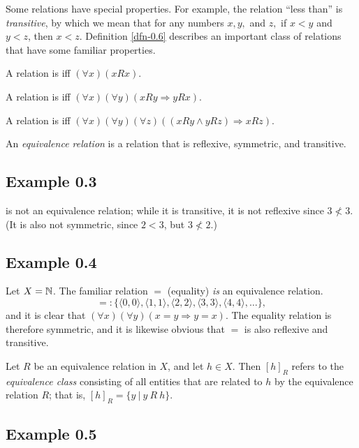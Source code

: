 Some relations have special properties. For example, the relation ``less than''
is \emph{transitive}, by which we mean that for any numbers $x, y,$ and $z,$
if $x < y$ and $y < z$, then $x < z$. Definition \ref{dfn-0.6} describes an important
class of relations that have some familiar properties.

\begin{dfn}\label{dfn-0.6}
A relation is \emph{} iff $(\forall x)(xRx)$.

A relation is \emph{} iff $(\forall x)(\forall y)(xRy
	\Rightarrow yRx)$.

A relation is \emph{} iff $(\forall x)(\forall y)(\forall z)
	((xRy \wedge yRz) \Rightarrow x Rz).$
    
An \emph{equivalence relation} is a relation that is reflexive, symmetric, and
transitive.
\end{dfn}

\subsection*{Example 0.3}

\< is not an equivalence relation; while it is transitive, it is not reflexive
since $3 \not< 3$. (It is also not symmetric, since $2 < 3$, but $3 \not< 2$.)

\subsection*{Example 0.4}

Let $X = \mathbb{N}$. The familiar relation $=$ (equality) \emph{is} an equivalence
relation.
\[= :\{\langle 0, 0\rangle , \langle 1,1\rangle , \langle 2,2\rangle ,
	\langle 3,3\rangle , \langle 4,4\rangle , \ldots \},\]
and it is clear that $(\forall x)(\forall y)(x = y \Rightarrow y = x)$.
The equality relation is therefore symmetric, and it is likewise obvious that
$=$ is also reflexive and transitive.

\begin{dfn}\label{dfn-0.7}
Let $R$ be an equivalence relation in $X$, and let $h \in X$. Then $[h]_R$
refers to the \emph{equivalence class} consisting of all entities that are
related to $h$ by the equivalence relation $R$; that is, $[h]_R = \{y\ |\ y\ R\ h\}$.
\end{dfn}

\subsection*{Example 0.5}

